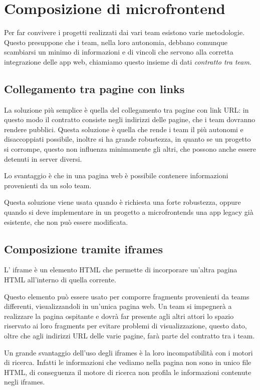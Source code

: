 \chapter{Composizione di microfrontend}\label{ch:composizione}
Per far convivere i progetti realizzati dai vari team esistono varie metodologie. Questo
 presuppone che i team, nella loro autonomia, debbano comunque scambiarsi un minimo di informazioni e di vincoli
che servono alla corretta integrazione delle app web, chiamiamo questo insieme di dati \emph{contratto tra team}.

\section{Collegamento tra pagine con links}
La soluzione più semplice è quella del collegamento tra pagine con link URL: in questo modo il contratto consiste negli indirizzi delle pagine,
che i team dovranno rendere pubblici.
Questa soluzione è quella che rende i team il più autonomi e disaccoppiati possibile, inoltre
si ha grande robustezza, in quanto se un progetto si corrompe, questo non influenza minimamente gli altri,
che possono anche essere detenuti in server diversi.

Lo svantaggio è che in una pagina web è possibile contenere informazioni provenienti da un solo team.

Questa soluzione viene usata quando è richiesta una forte robustezza, oppure quando si deve implementare 
in un progetto a microfrontends una app legacy già esistente, che non può essere modificata.


\section{Composizione tramite iframes}
L' iframe è un elemento HTML che permette di incorporare un'altra pagina HTML all'interno di quella corrente. \cite{mozillaiframe}

Questo elemento può essere usato per comporre fragments provenienti da teams differenti, visualizzandoli in un'unica
pagina web.
Un team si impegnerà a realizzare la pagina ospitante e dovrà far presente agli altri attori lo spazio riservato
ai loro fragments per evitare problemi di visualizzazione, questo dato, oltre che agli indirizzi
URL delle varie pagine, farà parte del contratto tra i team.

Un grande svantaggio dell’uso degli iframes è la loro incompatibilità con i motori di ricerca.
Infatti le informazioni che vediamo nella pagina non sono in unico file HTML, di conseguenza il motore di ricerca non profila le informazioni 
contenute negli iframes.

